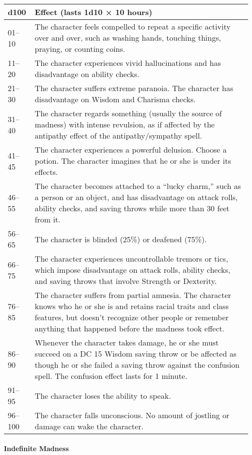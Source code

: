 \documentclass[
]{article}
\begin{document}
\begin{longtable}[]{@{}ll@{}}
\toprule
d100 & Effect (lasts 1d10 × 10 hours)\tabularnewline
\midrule
\endhead
01--10 & The character feels compelled to repeat a specific activity
over and over, such as washing hands, touching things, praying, or
counting coins.\tabularnewline
11--20 & The character experiences vivid hallucinations and has
disadvantage on ability checks.\tabularnewline
21--30 & The character suffers extreme paranoia. The character has
disadvantage on Wisdom and Charisma checks.\tabularnewline
31--40 & The character regards something (usually the source of madness)
with intense revulsion, as if affected by the antipathy effect of the
antipathy/sympathy spell.\tabularnewline
41--45 & The character experiences a powerful delusion. Choose a potion.
The character imagines that he or she is under its
effects.\tabularnewline
46--55 & The character becomes attached to a ``lucky charm,'' such as a
person or an object, and has disadvantage on attack rolls, ability
checks, and saving throws while more than 30 feet from
it.\tabularnewline
56--65 & The character is blinded (25\%) or deafened
(75\%).\tabularnewline
66--75 & The character experiences uncontrollable tremors or tics, which
impose disadvantage on attack rolls, ability checks, and saving throws
that involve Strength or Dexterity.\tabularnewline
76--85 & The character suffers from partial amnesia. The character knows
who he or she is and retains racial traits and class features, but
doesn't recognize other people or remember anything that happened before
the madness took effect.\tabularnewline
86--90 & Whenever the character takes damage, he or she must succeed on
a DC 15 Wisdom saving throw or be affected as though he or she failed a
saving throw against the confusion spell. The confusion effect lasts for
1 minute.\tabularnewline
91--95 & The character loses the ability to speak.\tabularnewline
96--100 & The character falls unconscious. No amount of jostling or
damage can wake the character.\tabularnewline
\bottomrule
\end{longtable}

\hypertarget{indefinite-madness}{%
\paragraph{Indefinite Madness}\label{indefinite-madness}}
\end{document}
